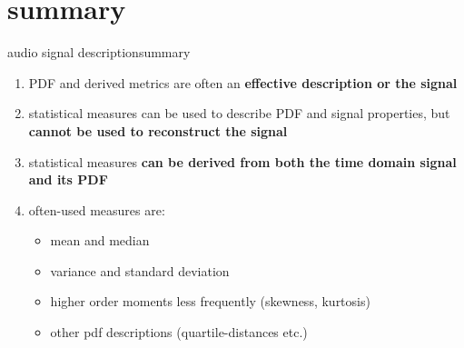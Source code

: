 \section{summary}
\begin{frame}{audio signal description}{summary}
    \begin{enumerate}
        \item   PDF and derived metrics are often an \textbf{effective description or the signal}
        \smallskip
        \item<2->   statistical measures can be used to describe PDF and signal properties, but \textbf{cannot be used to reconstruct the signal}
        \smallskip
        \item<3->   statistical measures \textbf{can be derived from both the time domain signal and its PDF}
        \smallskip
        \item<4->   often-used measures are:
            \begin{itemize}
                \item   mean and median
                \item   variance and standard deviation
                \item   higher order moments less frequently (skewness, kurtosis)
                \item   other pdf descriptions (quartile-distances etc.)
            \end{itemize}
    \end{enumerate}
\end{frame}		

    



